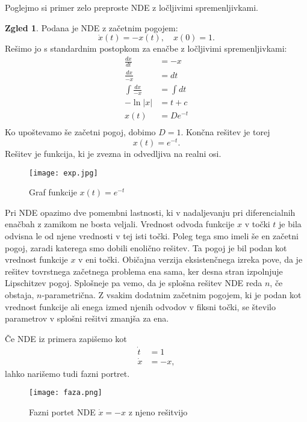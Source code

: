 \documentclass[12pt,a4paper]{amsart}
\theoremstyle{definition} %
\newtheorem{zgled}[definicija]{Zgled}
\theoremstyle{plain} %
\begin{document}
Poglejmo si primer zelo preproste NDE z ločljivimi spremenljivkami.

\begin{zgled}
    Podana je NDE z začetnim pogojem:
    \[\dot{x}(t) =-x(t),\quad x(0)=1.\]
    Rešimo jo s standardnim postopkom za enačbe z ločljivimi spremenljivkami:
    \begin{equation*}
    \begin{split}
      \frac{dx}{dt} & =-x \\
      \frac{dx}{-x} & =dt \\
      \int \frac{dx}{-x} & =\int dt \\
     -\ln|x| & =t+c \\
      x(t) & =De^{-t} \\
    \end{split}
    \end{equation*}
Ko upoštevamo še začetni pogoj, dobimo $D=1$. Končna rešitev je torej \[x(t)=e^{-t}.\]
Rešitev je funkcija, ki je zvezna in odvedljiva na realni osi.
\end{zgled}


\begin{figure}[h]
    \texttt{[image: exp.jpg]}
    \caption{Graf funkcije $x(t)=e^{-t}$}
\end{figure}


Pri NDE opazimo dve pomembni lastnosti, ki v nadaljevanju pri diferencialnih enačbah z zamikom ne bosta veljali. 
Vrednost odvoda funkcije $x$ v točki $t$ je bila odvisna le od njene vrednosti v tej isti točki. Poleg tega smo 
imeli še en začetni pogoj, zaradi katerega smo dobili enolično rešitev. Ta pogoj je bil podan kot vrednost funkcije
$x$ v eni točki. Običajna verzija eksistenčnega izreka pove, da je rešitev tovrstnega začetnega problema
ena sama, ker desna stran izpolnjuje Lipschitzev pogoj. Splošneje pa vemo, da
je splošna rešitev NDE reda $n$, če obstaja, $n$-parametrična.
Z vsakim dodatnim začetnim pogojem, ki je podan kot vrednost funkcije ali enega izmed njenih odvodov v fiksni točki,
se število parametrov v splošni rešitvi zmanjša za ena.

Če NDE iz primera zapišemo kot 
\begin{equation*}
    \begin{split}
        \dot{t} &= 1 \\
        \dot{x} &= -x,
    \end{split}
\end{equation*}
lahko narišemo tudi fazni portret.
\begin{figure}[h]
    \texttt{[image: faza.png]}
    \caption{Fazni portet NDE $\dot{x} = -x$ z njeno rešitvijo}
\end{figure}
\end{document}
